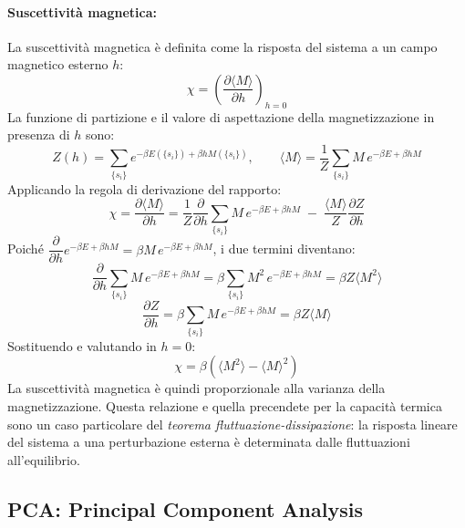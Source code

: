\paragraph{Suscettività magnetica:}
La suscettività magnetica è definita come la risposta del sistema 
a un campo magnetico esterno $h$:
\begin{equation}
    \chi = \left( \frac{\partial \langle M \rangle}{\partial h} \right)_{h=0}
\end{equation}
La funzione di partizione e il valore di aspettazione della 
magnetizzazione in presenza di $h$ sono:
\begin{equation}
    Z(h) = \sum_{\{s_i\}} e^{-\beta E(\{s_i\}) + \beta h M(\{s_i\})},
    \qquad
    \langle M \rangle = \frac{1}{Z}\sum_{\{s_i\}} M\, e^{-\beta E + \beta h M}
\end{equation}
Applicando la regola di derivazione del rapporto:
\begin{equation}
    \chi 
    = \frac{\partial \langle M \rangle}{\partial h}
    = \frac{1}{Z}\frac{\partial}{\partial h}\!\sum_{\{s_i\}} M\,e^{-\beta E+\beta h M}
    \;-\;
    \frac{\langle M \rangle}{Z}\frac{\partial Z}{\partial h}
\end{equation}
Poiché $\dfrac{\partial}{\partial h}e^{-\beta E+\beta h M} = \beta M\,e^{-\beta E+\beta h M}$, 
i due termini diventano:
\begin{equation}
    \frac{\partial}{\partial h}\!\sum_{\{s_i\}} M\,e^{-\beta E+\beta h M}
    = \beta \sum_{\{s_i\}} M^2\, e^{-\beta E+\beta h M}
    = \beta Z \langle M^2 \rangle
\end{equation}
\begin{equation}
    \frac{\partial Z}{\partial h}
    = \beta \sum_{\{s_i\}} M\, e^{-\beta E+\beta h M}
    = \beta Z \langle M \rangle
\end{equation}
Sostituendo e valutando in $h = 0$:
\begin{equation}
    \chi = \beta\!\left(\langle M^2 \rangle - \langle M \rangle^2\right)
\end{equation}
La suscettività magnetica è quindi proporzionale alla varianza della magnetizzazione. Questa relazione 
e quella precendete per la capacità termica sono un caso particolare 
del \emph{teorema fluttuazione-dissipazione}: la risposta lineare del sistema 
a una perturbazione esterna è determinata dalle fluttuazioni all'equilibrio.

\subsection{PCA: Principal Component Analysis}\label{appendice:pca}

